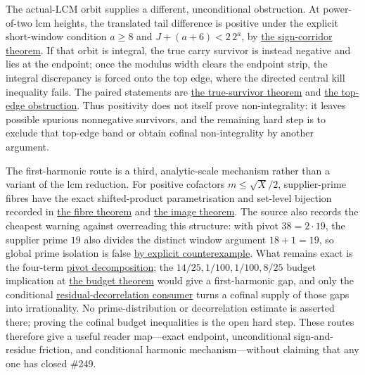 \documentclass[11pt]{article}
\newcommand{\commit}{bb4e24651b37cd096d3749ef299c3317930b3a3b}
\newcommand{\repobase}{https://github.com/wcook04/plectis-lean-erdos249-257/blob/\commit}
\newcommand{\PK}{Erdos249257}
\newcommand{\lword}[4]{\href{\repobase/\PK/#1\#L#2}{#4}}
\theoremstyle{definition}
\theoremstyle{remark}
\begin{document}
The actual-LCM orbit supplies a different, unconditional obstruction.  At
power-of-two lcm heights, the translated tail difference is positive under
the explicit short-window condition
\(a\ge8\) and \(J+(a+6)<2\,2^a\), by
\lword{TotientActualLcmOrbitSign.lean}{39}{actualLcmTailDiff_shift_pos}{the sign-corridor theorem}.
If that orbit is integral, the true carry survivor is instead negative and
lies at the endpoint; once the modulus width clears the endpoint strip, the
integral discrepancy is forced onto the top edge, where the directed central
kill inequality fails.  The paired statements are
\lword{TotientActualLcmOrbitSign.lean}{172}{actualLcm_trueEndpointSurvivor_neg}{the true-survivor theorem}
and
\lword{TotientActualLcmOrbitSign.lean}{211}{actualLcm_integral_forces_topEdgeResidue}{the top-edge obstruction}.
Thus positivity does not itself prove non-integrality: it leaves possible
spurious nonnegative survivors, and the remaining hard step is to exclude
that top-edge band or obtain cofinal non-integrality by another argument.

The first-harmonic route is a third, analytic-scale mechanism rather than a
variant of the lcm reduction.  For positive cofactors
\(m\le\sqrt X/2\), supplier-prime fibres have the exact shifted-product
parametrisation and set-level bijection recorded in
\lword{FirstHarmonicPivot.lean}{299}{mem_pivotFiber_iff_exists_supplierPrime}{the fibre theorem}
and
\lword{FirstHarmonicPivot.lean}{384}{image_pivotSupplierPrimes_eq_pivotFiber}{the image theorem}.
The source also records the cheapest warning against overreading this
structure: with pivot \(38=2\cdot19\), the supplier prime \(19\) also divides
the distinct window argument \(18+1=19\), so global prime isolation is false
\lword{FirstHarmonicPivot.lean}{394}{supplierPrime_not_globally_isolated_counterexample}{by explicit counterexample}.
What remains exact is the four-term
\lword{FirstHarmonicPivot.lean}{514}{windowFirstExp_sum_eq_pivot_decomposition}{pivot decomposition};
the \(14/25,1/100,1/100,8/25\) budget implication at
\lword{FirstHarmonicPivot.lean}{549}{first_harmonic_gap_of_pivotBudgetAt}{the budget theorem}
would give a first-harmonic gap, and only the conditional
\lword{FirstHarmonicPivot.lean}{577}{irrational_totient_series_of_pivotResidualDecorrelation}{residual-decorrelation consumer}
turns a cofinal supply of those gaps into irrationality.  No
prime-distribution or decorrelation estimate is asserted there; proving the
cofinal budget inequalities is the open hard step.  These routes therefore
give a useful reader map---exact endpoint, unconditional sign-and-residue
friction, and conditional harmonic mechanism---without claiming that any one
has closed \#249.
\end{document}
